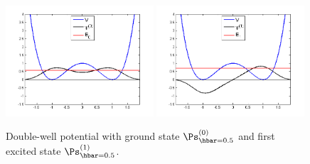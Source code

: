 \documentclass[12pt]{article}
\begin{document}
 \begin{figure}[t]
\begin{center}
\includegraphics[width=0.49\textwidth]{ZeroState.png}
\includegraphics[width=0.49\textwidth]{FirstState.png}
\caption{Double-well potential with ground state $\Ps_{\hbar=0.5}^{(0)}$ and first excited state $\Ps_{\hbar=0.5}^{(1)}$.}
\label{QMDubbelePut}
\end{center}
\end{figure}
\end{document}
